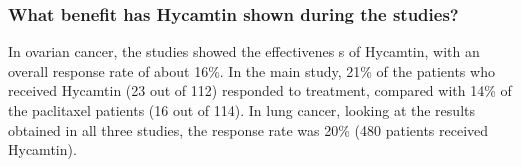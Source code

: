 \documentclass[output=paper]{langsci/langscibook}
\begin{document}
\subsubsection*{What benefit has Hycamtin shown during the studies?}
In ovarian cancer, the studies showed the effectivenes
s of Hycamtin, with an overall response rate of about 16\%. In the main study, 21\% of the patients who received Hycamtin (23 out of 112) responded to treatment, compared with 14\% of the paclitaxel patients (16 out of 114). In lung cancer, looking at the results obtained in all three studies, the response rate was 20\% (480 
patients received Hycamtin).



{\sloppy
\printbibliography[heading=subbibliography,notkeyword=this]
}
\end{document}
